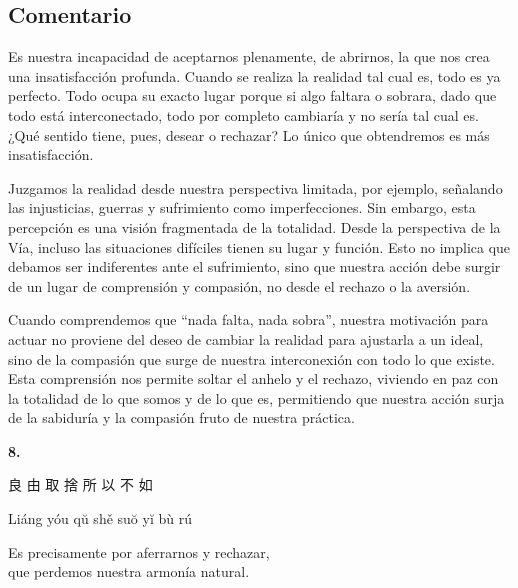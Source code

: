 \documentclass[
  a5paperpaper,
]{article}
\begin{document}
\hfill\break

\hypertarget{comentario-6}{%
\subsection{Comentario}\label{comentario-6}}

Es nuestra incapacidad de aceptarnos plenamente, de abrirnos, la que nos
crea una insatisfacción profunda. Cuando se realiza la realidad tal cual
es, todo es ya perfecto. Todo ocupa su exacto lugar porque si algo
faltara o sobrara, dado que todo está interconectado, todo por completo
cambiaría y no sería tal cual es. ¿Qué sentido tiene, pues, desear o
rechazar? Lo único que obtendremos es más insatisfacción.

Juzgamos la realidad desde nuestra perspectiva limitada, por ejemplo,
señalando las injusticias, guerras y sufrimiento como imperfecciones.
Sin embargo, esta percepción es una visión fragmentada de la totalidad.
Desde la perspectiva de la Vía, incluso las situaciones difíciles tienen
su lugar y función. Esto no implica que debamos ser indiferentes ante el
sufrimiento, sino que nuestra acción debe surgir de un lugar de
comprensión y compasión, no desde el rechazo o la aversión.

Cuando comprendemos que ``nada falta, nada sobra'', nuestra motivación
para actuar no proviene del deseo de cambiar la realidad para ajustarla
a un ideal, sino de la compasión que surge de nuestra interconexión con
todo lo que existe. Esta comprensión nos permite soltar el anhelo y el
rechazo, viviendo en paz con la totalidad de lo que somos y de lo que
es, permitiendo que nuestra acción surja de la sabiduría y la compasión
fruto de nuestra práctica.

\hfill\break

\hypertarget{03}{}
\begin{verseblock}

\newpage

\begin{center}\textbf{8.}\end{center}

良 由 取 捨 所 以 不 如

Liáng yóu qŭ shě suŏ yĭ bù rú

Es precisamente por aferrarnos y rechazar,\\
que perdemos nuestra armonía natural.

\end{verseblock}

\hfill\break
\end{document}
